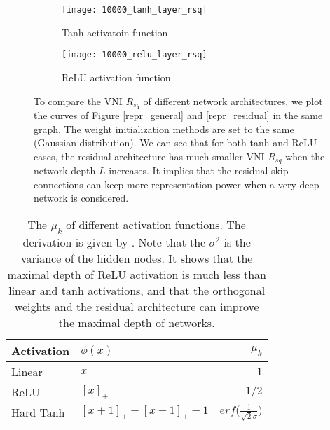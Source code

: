 \begin{figure}[h]
    \centering
    \newcommand{\myWidth}{0.9\textwidth}
    \begin{subfigure}{\myWidth}
      \centering
      \caption{Tanh activatoin function}
      \texttt{[image: 10000\_tanh\_layer\_rsq]}
      \label{fig:repr_architecture_a}
    \end{subfigure}
    
    \begin{subfigure}{\myWidth}
      \centering
      \caption{ReLU activation function}
      \texttt{[image: 10000\_relu\_layer\_rsq]}
      \label{fig:repr_architecture_b}
    \end{subfigure}%
    \caption[The initial VNI $R_{sq}$ of different network architectures.]{
    To compare the VNI $R_{sq}$ of different network architectures, we plot the curves of Figure
    \ref{repr_general} and \ref{repr_residual} in the same graph.
    The weight initialization methods are set to the same (Gaussian distribution).
    We can see that for both tanh and ReLU cases, the residual architecture has much smaller VNI
    $R_{sq}$ when the network depth $L$ increases.
    It implies that the residual skip connections can keep more representation power when a very deep
    network is considered.
    }
    \label{fig:repr_architecture}
\end{figure}

\begin{table}[h]
    \centering
    \begin{tabular}{|l|l|r|}
    \hline
        Activation & $\phi(x)$ & $\mu_k$\\\hline
        Linear & $x$ & $1$\\\hline
        ReLU & $[x]_{+}$ & $1/2$\\\hline
        Hard Tanh & $[x+1]_{+}-[x-1]_{+}-1$ & $erf\Big(\frac{1}{\sqrt{2}\sigma}\Big)$\\\hline
    \end{tabular}
    \caption[The $\mu_k$ of different activation functions.]
    {The $\mu_k$ of different activation functions.
    The derivation is given by \cite{mft:spectral}.
    Note that the $\sigma^2$ is the variance of the hidden nodes.
    It shows that the maximal depth of ReLU activation is much less than linear and tanh
    activations, and that the orthogonal weights and the residual architecture can improve
    the maximal depth of networks.}
    \label{table:mu}
\end{table}


